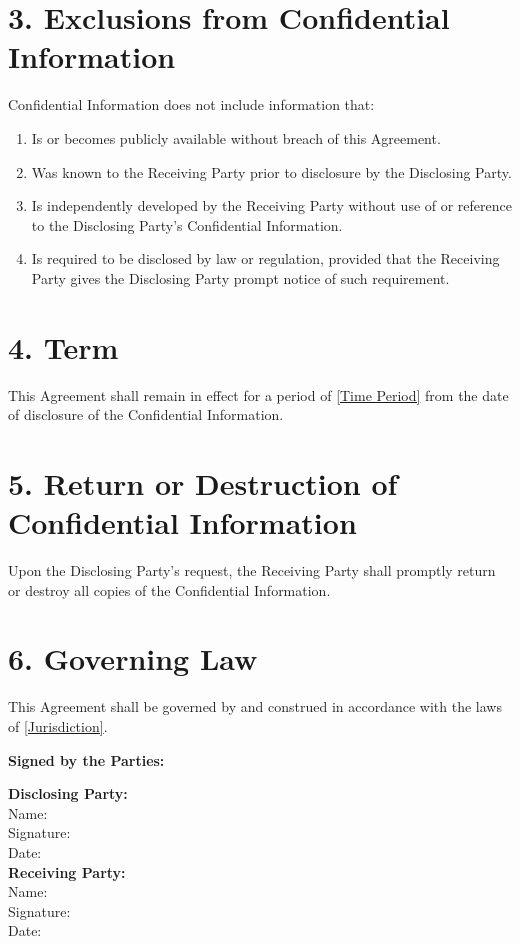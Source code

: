 \documentclass[12pt]{article}
\begin{document}
\section*{3. Exclusions from Confidential Information}
Confidential Information does not include information that:
\begin{enumerate}
    \item Is or becomes publicly available without breach of this Agreement.
    \item Was known to the Receiving Party prior to disclosure by the Disclosing Party.
    \item Is independently developed by the Receiving Party without use of or reference to the Disclosing Party's Confidential Information.
    \item Is required to be disclosed by law or regulation, provided that the Receiving Party gives the Disclosing Party prompt notice of such requirement.
\end{enumerate}

\section*{4. Term}
This Agreement shall remain in effect for a period of \underline{[Time Period]} from the date of disclosure of the Confidential Information.

\section*{5. Return or Destruction of Confidential Information}
Upon the Disclosing Party's request, the Receiving Party shall promptly return or destroy all copies of the Confidential Information.

\section*{6. Governing Law}
This Agreement shall be governed by and construed in accordance with the laws of \underline{[Jurisdiction]}.

\vspace{1cm}
\noindent \textbf{Signed by the Parties:}

\vspace{1cm}
\noindent \textbf{Disclosing Party:} \\
Name: \TextField[name=DisclosingPartySignatureName,width=3in]{} \\
Signature: \TextField[name=DisclosingPartySignature,width=3in]{} \\
Date: \TextField[name=DisclosingPartySignatureDate,width=2in]{} \\

\vspace{1cm}
\noindent \textbf{Receiving Party:} \\
Name: \TextField[name=ReceivingPartySignatureName,width=3in]{} \\
Signature: \TextField[name=ReceivingPartySignature,width=3in]{} \\
Date: \TextField[name=ReceivingPartySignatureDate,width=2in]{} \\
\end{document}
